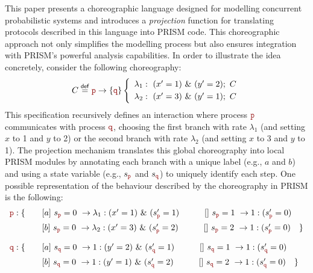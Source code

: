 This paper presents a choreographic language designed for modelling
concurrent probabilistic systems and introduces a {\em projection}
function for translating protocols described in this language into
PRISM code. This choreographic approach not only simplifies the
modelling process but also ensures integration with PRISM's powerful
analysis capabilities.
%
In order to illustrate the idea concretely, consider the following
choreography:
%
\[
  \begin{array}{lll}
    C \stackrel{\mathsf{def}}{=} \interactBase{\nr}{\nrr}
    \left\{
    \begin{array}{lll}
      \lambda_1: \ (x'=1)\ \&\ (y'=2);\ C\\[1mm]
      \lambda_2: \ (x'=3)\ \&\ (y'=1);\ C
    \end{array}
    \right.
  \end{array}
\]
%
This specification recursively defines an interaction where process
\(\role{p}\) communicates with process \(\role{q}\), choosing the
first branch with rate $\lambda_1$ (and setting \(x\) to 1 and \(y\)
to 2) or the second branch with rate $\lambda_2$ (and setting \(x\) to
3 and \(y\) to 1). 
% 
The projection mechanism translates this global choreography into
local PRISM modules by annotating each branch with a unique label
(e.g., $a$ and $b$) and using a state variable (e.g., \(s_{\role p}\)
and \(s_{\role q}\)) to uniquely identify each step.
%
One possible representation of the behaviour described by the
choreography in PRISM is the following:
%
\[
\begin{array}{llll}
\role{p}: \{ & \quad \commandBase {a}{s_{\role p}=0} {\lambda_1:(x'=1)\ \&\ (s_{\role p}'=1)} \quad\qquad \commandBase {}{s_{\role p}=1} {1:(s_{\role p}'=0)}\\[2mm]
              & \quad \commandBase {b}{s_{\role p}=0} {\lambda_2:(x'=3)\ \&\ (s_{\role p}'=2)} \quad\qquad \commandBase {}{s_{\role p}=2} {1:(s_{\role p}'=0)} \quad \}\\[4mm]
\role{q}: \{ & \quad \commandBase {a}{s_{\role q}=0} {1:(y'=2)\ \&\ (s_{\role q}'=1)} \qquad\quad \commandBase {}{s_{\role q}=1} {1:(s_{\role q}'=0)}\\[2mm]
              & \quad \commandBase {b}{s_{\role q}=0} {1:(y'=1)\ \&\ (s_{\role q}'=2)} \qquad\quad \commandBase {}{s_{\role q}=2} {1:(s_{\role q}'=0)} \quad \}\\
\end{array}
\]
